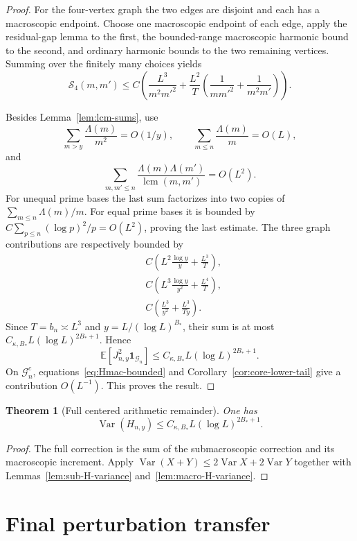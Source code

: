\documentclass[11pt]{article}
\newtheorem{theorem}{Theorem}[section]
\theoremstyle{remark}
\newcommand{\Ee}{\mathbb E}
\newcommand{\Var}{\operatorname{Var}}
\newcommand{\one}{\mathbf 1}
\newcommand{\lcm}{\operatorname{lcm}}
\begin{document}
\begin{proof}
For the four-vertex graph the two edges are disjoint and each has a
macroscopic endpoint.  Choose one macroscopic endpoint of each edge, apply
the residual-gap lemma to the first, the bounded-range macroscopic harmonic
bound to the second, and ordinary harmonic bounds to the two remaining
vertices.  Summing over the finitely many choices yields
\[
 \mathcal S_4(m,m')\le C\left(\frac{L^3}{m^2m'^2}
 +\frac{L^2}{T}\left(\frac1{mm'^2}+\frac1{m^2m'}\right)\right).
\]

Besides Lemma~\ref{lem:lcm-sums}, use
\[
 \sum_{m>y}\frac{\Lambda(m)}{m^2}=O(1/y),
 \qquad
 \sum_{m\le n}\frac{\Lambda(m)}m=O(L),
\]
and
\[
 \sum_{m,m'\le n}
 \frac{\Lambda(m)\Lambda(m')}{\lcm(m,m')}=O(L^2).
\]
For unequal prime bases the last sum factorizes into two copies of
$\sum_{m\le n}\Lambda(m)/m$.  For equal prime bases it is bounded by
$C\sum_{p\le n}(\log p)^2/p=O(L^2)$, proving the last estimate.
The three graph contributions are respectively bounded by
\begin{align*}
 &C\left( L^2\frac{\log y}{y}+\frac{L^3}{T}\right),\\
 &C\left(
 L^3\frac{\log y}{y^2}+\frac{L^4}{T}\right),\\
 &C\left(
 \frac{L^3}{y^2}+\frac{L^3}{Ty}\right).
\end{align*}
Since $T=b_n\asymp L^3$ and $y=L/(\log L)^{B_*}$, their sum is at most
$C_{\kappa,B_*}L(\log L)^{2B_*+1}$.  Hence
\[
 \Ee[J_{n,y}^2\one_{\mathcal G_n}]
 \le C_{\kappa,B_*}L(\log L)^{2B_*+1}.
\]
On $\mathcal G_n^c$, equations~\eqref{eq:Hmac-bounded} and
Corollary~\ref{cor:core-lower-tail} give a contribution $O(L^{-1})$.
This proves the result.
\end{proof}

\begin{theorem}[Full centered arithmetic remainder]
\label{thm:full-H-variance}
One has
\begin{equation}
\label{eq:full-H-variance}
 \Var(H_{n,y})\le C_{\kappa,B_*}L(\log L)^{2B_*+1}.
\end{equation}
\end{theorem}

\begin{proof}
The full correction is the sum of the submacroscopic correction and its
macroscopic increment.  Apply
$\Var(X+Y)\le2\Var X+2\Var Y$ together with
Lemmas~\ref{lem:sub-H-variance} and~\ref{lem:macro-H-variance}.
\end{proof}

\section{Final perturbation transfer}
\label{sec:final-edgeworth}
\end{document}
